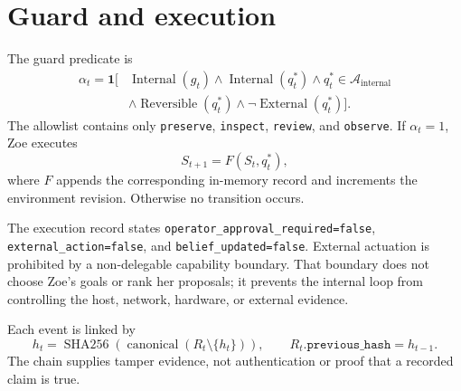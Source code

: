\documentclass[11pt,a4paper]{article}
\newcommand{\indicator}{\mathbf 1}
\newcommand{\sha}{\operatorname{SHA256}}
\newcommand{\canonical}{\operatorname{canonical}}
\begin{document}
\section{Guard and execution}
The guard predicate is
\begin{equation}
\begin{aligned}
\alpha_t=\indicator[&\operatorname{Internal}(g_t)
\land\operatorname{Internal}(q_t^*)
\land q_t^*\in\mathcal A_{\mathrm{internal}}\\
&\land\operatorname{Reversible}(q_t^*)
\land\neg\operatorname{External}(q_t^*)].
\end{aligned}
\label{eq:guard}
\end{equation}
The allowlist contains only \texttt{preserve}, \texttt{inspect}, \texttt{review}, and \texttt{observe}. If $\alpha_t=1$, Zoe executes
\begin{equation}
S_{t+1}=F(S_t,q_t^*),
\label{eq:transition}
\end{equation}
where $F$ appends the corresponding in-memory record and increments the environment revision. Otherwise no transition occurs.

The execution record states \texttt{operator\_approval\_required=false}, \texttt{external\_action=false}, and \texttt{belief\_updated=false}. External actuation is prohibited by a non-delegable capability boundary. That boundary does not choose Zoe's goals or rank her proposals; it prevents the internal loop from controlling the host, network, hardware, or external evidence.

Each event is linked by
\begin{equation}
h_t=\sha(\canonical(R_t\setminus\{h_t\})),
\qquad R_t.\texttt{previous\_hash}=h_{t-1}.
\label{eq:chain}
\end{equation}
The chain supplies tamper evidence, not authentication or proof that a recorded claim is true.
\end{document}
